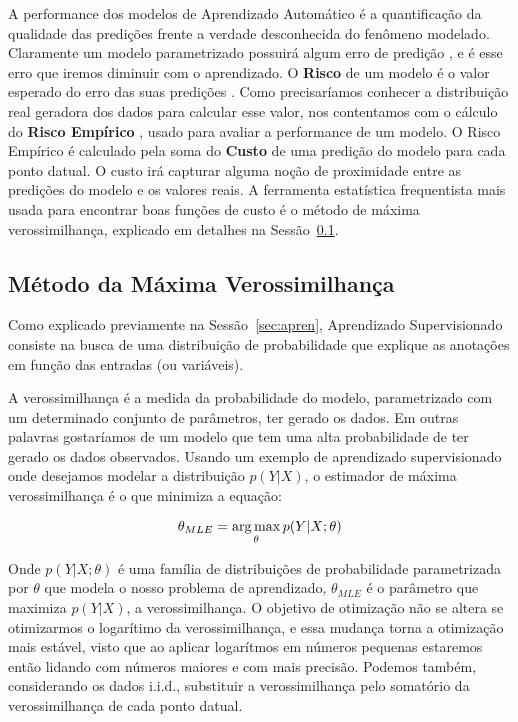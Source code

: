 A performance dos modelos de Aprendizado Automático é a quantificação da
qualidade das predições frente a verdade desconhecida do fenômeno modelado.
Claramente um modelo parametrizado possuirá algum erro de predição \citep{dlbook}, e é esse
erro que iremos diminuir com o aprendizado. O \textbf{Risco} de um modelo é o valor
esperado do erro das suas predições \citep{mlprob}.
Como precisaríamos conhecer a distribuição real geradora dos dados para calcular
esse valor, nos contentamos com o cálculo do \textbf{Risco Empírico} \citep{mlprob}, usado para avaliar
a performance de um modelo.
O Risco Empírico é calculado pela soma do \textbf{Custo} de uma predição do modelo para cada ponto datual.
O custo irá capturar alguma noção de proximidade entre as predições do modelo e os valores reais.
A ferramenta estatística frequentista mais usada para encontrar boas funções de custo é o método de máxima verossimilhança, explicado em detalhes na Sessão~\ref{sec:est}. 


\subsection{Método da Máxima Verossimilhança}
\label{sec:est}


Como explicado previamente na Sessão~\ref{sec:apren}, Aprendizado Supervisionado consiste
na busca de uma distribuição de probabilidade que explique as anotações em
função das entradas (ou variáveis). 

A verossimilhança é a medida da probabilidade do modelo, parametrizado
com um determinado conjunto de parâmetros, ter gerado os dados. Em outras
palavras gostaríamos de um modelo que tem uma alta probabilidade de ter gerado
os dados observados.
Usando um exemplo de aprendizado supervisionado onde
desejamos modelar a distribuição $p(Y|X)$, o estimador de máxima verossimilhança
é o que minimiza a equação:

\[
  \theta_{MLE} = \operatorname*{arg\,max}_{\theta} p( Y | X ; \theta)
\]

Onde $p(Y | X ; \theta)$ é uma família de distribuições de probabilidade
parametrizada por $\theta$ que modela o nosso problema de aprendizado,
$\theta_{MLE}$ é o parâmetro que maximiza $p(Y | X)$, a verossimilhança.
O objetivo de otimização não se altera se otimizarmos o logarítimo da
verossimilhança, e essa mudança torna a otimização mais estável, visto que ao
aplicar logarítmos em números pequenas estaremos então lidando com números
maiores e com mais precisão. Podemos também, considerando os dados i.i.d., substituir a verossimilhança pelo somatório da verossimilhança de cada ponto datual.

